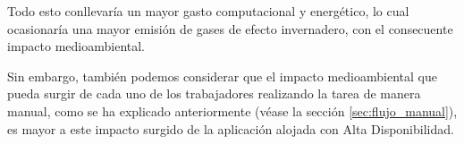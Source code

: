 Todo esto conllevaría un mayor gasto computacional y energético, lo cual ocasionaría una mayor emisión de gases de efecto invernadero, con el consecuente impacto medioambiental\cite{impacto_medioambiental}.

Sin embargo, también podemos considerar que el impacto medioambiental que pueda surgir de cada uno de los trabajadores realizando la tarea de manera manual, como se ha explicado anteriormente (véase la sección \ref{sec:flujo_manual}), es mayor a este impacto surgido de la aplicación alojada con Alta Disponibilidad.